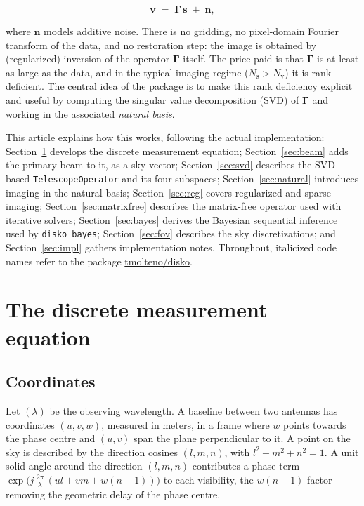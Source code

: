 \documentclass[11pt,a4paper]{article}
\newcommand{\Ns}{N_{\mathrm{s}}}
\newcommand{\Nv}{N_{\mathrm{v}}}
\newcommand{\Gammam}{\boldsymbol{\Gamma}}
\newcommand{\svec}{\boldsymbol{s}}
\newcommand{\vvec}{\boldsymbol{v}}
\begin{document}
\begin{equation}
  \label{eq:measurement}
  \vvec \;=\; \Gammam\,\svec \;+\; \boldsymbol{n},
\end{equation}

where $\boldsymbol{n}$ models additive noise. There is no gridding, no
pixel-domain Fourier transform of the data, and no restoration step: the image
is obtained by (regularized) inversion of the operator $\Gammam$ itself. The
price paid is that $\Gammam$ is at least as large as the data, and in the
typical imaging regime ($\Ns > \Nv$) it is rank-deficient. The central idea of
the package is to make this rank deficiency explicit and useful by computing
the singular value decomposition (SVD) of $\Gammam$ and working in the
associated \emph{natural basis}.

This article explains how this works, following the actual implementation:
Section~\ref{sec:model} develops the discrete measurement equation;
Section~\ref{sec:beam} adds the primary beam to it, as a sky vector;
Section~\ref{sec:svd} describes the SVD-based \texttt{TelescopeOperator} and its
four subspaces; Section~\ref{sec:natural} introduces imaging in the natural
basis; Section~\ref{sec:reg} covers regularized and sparse imaging;
Section~\ref{sec:matrixfree} describes the matrix-free operator used with
iterative solvers; Section~\ref{sec:bayes} derives the Bayesian sequential
inference used by \texttt{disko\_bayes}; Section~\ref{sec:fov} describes the
sky discretizations; and Section~\ref{sec:impl} gathers implementation notes.
Throughout, italicized code names refer to the package
\href{https://github.com/tmolteno/disko}{tmolteno/disko}.

\section{The discrete measurement equation}
\label{sec:model}

\subsection{Coordinates}

Let $(\lambda)$ be the observing wavelength. A baseline between two antennas
has coordinates $(u,v,w)$, measured in meters, in a frame where $w$ points
towards the phase centre and $(u,v)$ span the plane perpendicular to it. A
point on the sky is described by the direction cosines
$(l,m,n)$, with $l^2+m^2+n^2=1$. A unit solid angle around the direction
$(l,m,n)$ contributes a phase term
$\exp\!\big(j\,\tfrac{2\pi}{\lambda}\,(ul+vm+w(n-1))\big)$ to each visibility,
the $w(n-1)$ factor removing the geometric delay of the phase centre.
\end{document}
